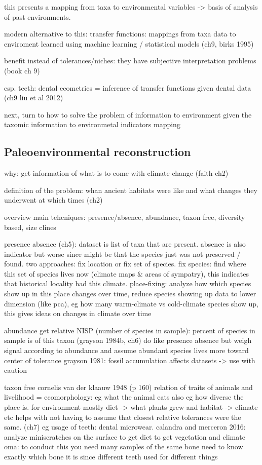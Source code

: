 \documentclass{article}
\begin{document}
this presents a mapping from taxa to environmental variables -> basis of analysis 
of past environments.

modern alternative to this: transfer functions: mappings from taxa data to enviroment 
learned using machine learning / statistical models (ch9, birks 1995)

benefit instead of tolerances/niches: they have subjective interpretation problems (book ch 9)

esp. teeth: dental ecometrics = inference of transfer functions given dental data (ch9 liu et al 2012)

next, turn to how to solve the problem of information to environment given the 
taxomic information to environmetal indicators mapping

\subsection{Paleoenvironmental reconstruction}

why: get information of what is to come with climate change (faith ch2)

definition of the problem: whan ancient habitats were like and what changes they 
underwent at which times (ch2)

overview main tehcniques: presence/absence, abundance, taxon free, diversity based,
size clines

presence absence (ch5):
dataset is list of taxa that are present. absence is also indicator 
but worse since might be that the species just was not preserved / found. two approaches: 
fix location or fix set of species.
fix species: find where this set of species lives now (climate maps \& areas of sympatry), this indicates 
that historical locality had this climate. place-fixing: analyze how which species show up in this place
 changes over time, reduce species showing up data to lower dimension
(like pca), eg how many warm-climate vs cold-climate species show up, this gives ideas on changes in climate over time

abundance 
get relative NISP (number of species in sample): percent of species in sample is of this taxon (grayson 1984b, ch6)
do like presence absence but weigh signal according to abundance
and assume abundant species lives more toward center of tolerance 
grayson 1981: fossil accumulation affects datasets -> use with caution

taxon free 
cornelis van der klaauw 1948 (p 160) relation of traits of animals and livelihood = ecomorphology:
 eg what the animal eats also eg how diverse the place is. for environment mostly diet -> what plants grew and habitat -> climate etc
helps with not having to assume that closest relative tolerances were the same. (ch7)
eg usage of teeth: dental microwear. calandra and merceron 2016: analyze miniscratches on the surface to get diet to get vegetation and climate
    oma: to conduct this you need many samples of the same bone
    need to know exactly which bone it is since different teeth used for different things
\end{document}
